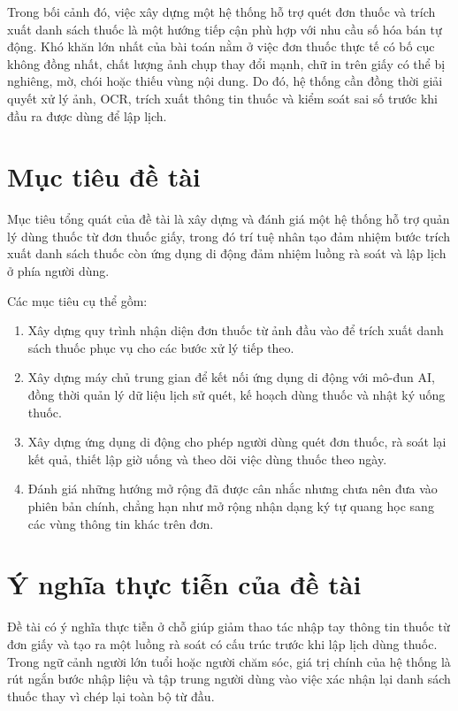 \documentclass[12pt,a4paper]{report}
\begin{document}
Trong bối cảnh đó, việc xây dựng một hệ thống hỗ trợ quét đơn thuốc và trích xuất danh sách thuốc là một hướng tiếp cận phù hợp với nhu cầu số hóa bán tự động. Khó khăn lớn nhất của bài toán nằm ở việc đơn thuốc thực tế có bố cục không đồng nhất, chất lượng ảnh chụp thay đổi mạnh, chữ in trên giấy có thể bị nghiêng, mờ, chói hoặc thiếu vùng nội dung. Do đó, hệ thống cần đồng thời giải quyết xử lý ảnh, OCR, trích xuất thông tin thuốc và kiểm soát sai số trước khi đầu ra được dùng để lập lịch.

\section{Mục tiêu đề tài}

Mục tiêu tổng quát của đề tài là xây dựng và đánh giá một hệ thống hỗ trợ quản lý dùng thuốc từ đơn thuốc giấy, trong đó trí tuệ nhân tạo đảm nhiệm bước trích xuất danh sách thuốc còn ứng dụng di động đảm nhiệm luồng rà soát và lập lịch ở phía người dùng.

Các mục tiêu cụ thể gồm:

\begin{enumerate}[label=\arabic*.]
    \item Xây dựng quy trình nhận diện đơn thuốc từ ảnh đầu vào để trích xuất danh sách thuốc phục vụ cho các bước xử lý tiếp theo.
    \item Xây dựng máy chủ trung gian để kết nối ứng dụng di động với mô-đun AI, đồng thời quản lý dữ liệu lịch sử quét, kế hoạch dùng thuốc và nhật ký uống thuốc.
    \item Xây dựng ứng dụng di động cho phép người dùng quét đơn thuốc, rà soát lại kết quả, thiết lập giờ uống và theo dõi việc dùng thuốc theo ngày.
    \item Đánh giá những hướng mở rộng đã được cân nhắc nhưng chưa nên đưa vào phiên bản chính, chẳng hạn như mở rộng nhận dạng ký tự quang học sang các vùng thông tin khác trên đơn.
\end{enumerate}

\section{Ý nghĩa thực tiễn của đề tài}

Đề tài có ý nghĩa thực tiễn ở chỗ giúp giảm thao tác nhập tay thông tin thuốc từ đơn giấy và tạo ra một luồng rà soát có cấu trúc trước khi lập lịch dùng thuốc. Trong ngữ cảnh người lớn tuổi hoặc người chăm sóc, giá trị chính của hệ thống là rút ngắn bước nhập liệu và tập trung người dùng vào việc xác nhận lại danh sách thuốc thay vì chép lại toàn bộ từ đầu.
\end{document}
